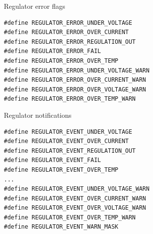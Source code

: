 \documentclass[aspectratio=169]{beamer}
\begin{document}

\begin{frame}[fragile]{Regulator error flags}
\begin{lstlisting}
#define REGULATOR_ERROR_UNDER_VOLTAGE
#define REGULATOR_ERROR_OVER_CURRENT
#define REGULATOR_ERROR_REGULATION_OUT
#define REGULATOR_ERROR_FAIL
#define REGULATOR_ERROR_OVER_TEMP
#define REGULATOR_ERROR_UNDER_VOLTAGE_WARN
#define REGULATOR_ERROR_OVER_CURRENT_WARN
#define REGULATOR_ERROR_OVER_VOLTAGE_WARN
#define REGULATOR_ERROR_OVER_TEMP_WARN
\end{lstlisting}
\end{frame}


\begin{frame}[fragile]{Regulator notifications}
\begin{lstlisting}
#define REGULATOR_EVENT_UNDER_VOLTAGE 
#define REGULATOR_EVENT_OVER_CURRENT  
#define REGULATOR_EVENT_REGULATION_OUT
#define REGULATOR_EVENT_FAIL
#define REGULATOR_EVENT_OVER_TEMP
...
#define REGULATOR_EVENT_UNDER_VOLTAGE_WARN
#define REGULATOR_EVENT_OVER_CURRENT_WARN
#define REGULATOR_EVENT_OVER_VOLTAGE_WARN
#define REGULATOR_EVENT_OVER_TEMP_WARN
#define REGULATOR_EVENT_WARN_MASK
\end{lstlisting}

\end{frame}

\end{document}
